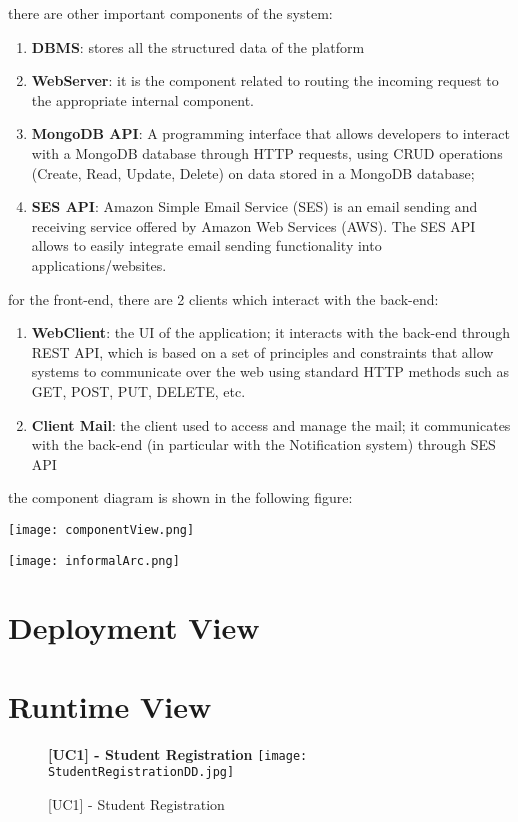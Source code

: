 			there are other important components of the system:
			\begin{enumerate}
				\item \textbf{DBMS}: stores all the structured data of the platform
				\item \textbf {WebServer}: it is the component related to routing the incoming request to the appropriate internal component.
				\item \textbf{MongoDB API}: A programming interface that allows developers to interact with a MongoDB database through HTTP requests, using CRUD operations (Create, Read, Update, Delete) on data stored in a MongoDB database;
				\item \textbf{SES API}: Amazon Simple Email Service (SES) is an email sending and receiving service offered by Amazon Web Services (AWS). The SES API allows to easily integrate email sending functionality into applications/websites.
			
			\end{enumerate}
			
			for the front-end, there are 2 clients which interact with the back-end:
			\begin{enumerate}
				\item \textbf{WebClient}: the UI of the application; it interacts with the back-end through REST API, which is based on a set of principles and constraints that allow systems to communicate over the web using standard HTTP methods such as GET, POST, PUT, DELETE, etc.
				\item \textbf{Client Mail}: the client used to access and manage the mail; it communicates with the back-end (in particular with the Notification system) through SES API
			\end{enumerate}
			
			the component diagram is shown in the following figure:
			
			\texttt{[image: componentView.png]}
			
			\texttt{[image: informalArc.png]}
	
	\section{Deployment View}
	\section{Runtime View}
		\begin{figure}[H]
			\centering
			{\bfseries [UC1] - Student Registration}
			\texttt{[image: StudentRegistrationDD.jpg]}
			\caption{[UC1] - Student Registration}
		\end{figure}
			
